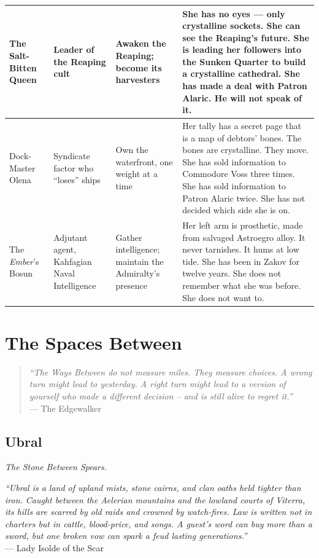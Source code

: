 \documentclass[12pt,oneside]{book}
\begin{document}
\begin{longtable}{|p{}|p{}|p{}|p{}|}
\hline
The Salt-Bitten Queen & Leader of the Reaping cult & Awaken the Reaping; become its harvesters & She has no eyes --- only crystalline sockets. She can see the Reaping's future. She is leading her followers into the Sunken Quarter to build a crystalline cathedral. She has made a deal with Patron Alaric. He will not speak of it. \\
\hline
Dock-Master Olena & Syndicate factor who ``loses'' ships & Own the waterfront, one weight at a time & Her tally has a secret page that is a map of debtors' bones. The bones are crystalline. They move. She has sold information to Commodore Voss three times. She has sold information to Patron Alaric twice. She has not decided which side she is on. \\
\hline
The \emph{Ember}'s Bosun & Adjutant agent, Kahfagian Naval Intelligence & Gather intelligence; maintain the Admiralty's presence & Her left arm is prosthetic, made from salvaged Astroegro alloy. It never tarnishes. It hums at low tide. She has been in Zakov for twelve years. She does not remember what she was before. She does not want to. \\
\hline
\end{longtable}




\part{The Spaces Between}

\begin{quote}
  \small
  \textit{``The Ways Between do not measure miles. They measure choices. A wrong turn might lead to yesterday. A right turn might lead to a version of yourself who made a different decision -- and is still alive to regret it.''}
  \\ --- The Edgewalker
\end{quote}

\chapter{Ubral}
\emph{The Stone Between Spears.}

\noindent
\textit{``Ubral is a land of upland mists, stone cairns, and clan oaths held tighter than iron. Caught between the Aelerian mountains and the lowland courts of Viterra, its hills are scarred by old raids and crowned by watch-fires. Law is written not in charters but in cattle, blood-price, and songs. A guest's word can buy more than a sword, but one broken vow can spark a feud lasting generations.''} \\
--- Lady Isolde of the Scar
\end{document}

